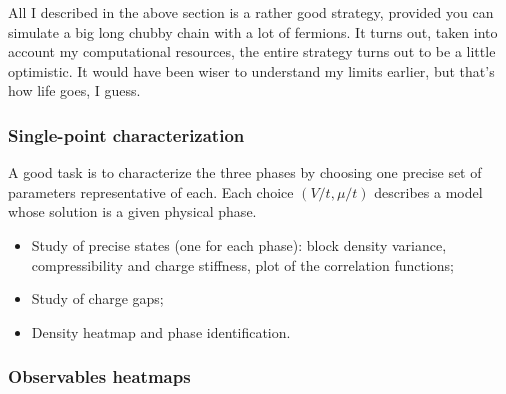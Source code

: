 All I described in the above section is a rather good strategy, provided you can simulate a big long chubby chain with a lot of fermions. It turns out, taken into account my computational resources, the entire strategy turns out to be a little optimistic. It would have been wiser to understand my limits earlier, but that's how life goes, I guess.

\subsubsection*{Single-point characterization}

A good task is to characterize the three phases by choosing one precise set of parameters representative of each. Each choice $(V/t,\mu/t)$ describes a model whose solution is a given physical phase.

{\color{tabred}
	\begin{itemize}
		\item Study of precise states (one for each phase): block density variance, compressibility and charge stiffness, plot of the correlation functions;
		\item Study of charge gaps;
		\item Density heatmap and phase identification.
	\end{itemize}
}

\subsubsection*{Observables heatmaps}

\todo